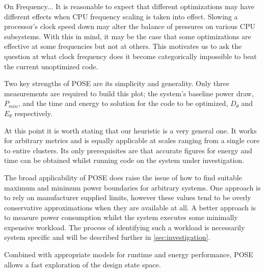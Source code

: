 


On Frequency...
It is reasonable to expect that different optimizations may have different effects when CPU frequency scaling is taken into effect. Slowing a processor's clock speed down may alter the balance of pressures on various CPU subsystems. With this in mind, it may be the case that some optimizations are effective at some frequencies but not at others. This motivates us to ask the question at what clock frequency does it become categorically impossible to beat the current unoptimized code.

\todo{} Two key strengths of POSE are its simplicity and generality.
Only three measurements are required to build this plot; the system's baseline power draw, $P_{min}$, and the time and energy to solution for the code to be optimized, $D_\theta$ and $E_\theta$ respectively.



\todo{} At this point it is worth stating that our heuristic is a very general one.
It works for arbitrary metrics and is equally applicable at scales ranging from a single core to entire clusters.
Its only prerequisites are that accurate figures for energy and time can be obtained whilst running code on the system under investigation.

The broad applicability of POSE does raise the issue of how to find suitable maximum and minimum power boundaries for arbitrary systems. 
One approach is to rely on manufacturer supplied limits, however these values tend to be overly conservative approximations when they are available at all.
A better approach is to measure power consumption whilst the system executes some minimally expensive workload. 
The process of identifying such a workload is necessarily system specific and will be described further in \autoref{sec:investigation}.


Combined with appropriate models for runtime and energy performance, POSE allows a fast exploration of the design state space.
